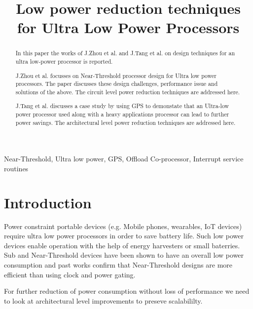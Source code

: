 \documentclass[conference]{IEEEtran}
\begin{document}
\title{Low power reduction techniques for Ultra Low Power Processors}

\author{
}

\maketitle

\begin{abstract}
In this paper the works of J.Zhou et al. \cite{b1} and J.Tang et al. \cite{b2}
on design techniques for an ultra low-power processor is reported.

J.Zhou et al. focusses on Near-Threshold processor design for Ultra low power
processors. The paper discusses these design challenges, performance issue and solutions
of the above. The circuit level power reduction techniques are addressed here.

J.Tang et al. discusses a case study by using GPS to demonstate that an
Ultra-low power processor used along with a heavy applications processor can
lead to further power savings. The architectural level power reduction
techniques are addressed here.
\end{abstract}

\begin{IEEEkeywords}
Near-Threshold, Ultra low power, GPS, Offload Co-processor, Interrupt service
routines
\end{IEEEkeywords}

\section{Introduction} \label{sec:introduction}

Power constraint portable devices (e.g. Mobile phones, wearables, IoT
devices) require ultra low power processors in order to save battery life. Such
low power devices enable operation with the help of energy harvesters or small baterries.
Sub and Near-Threshold devices have been shown to have an overall low power
consumption and past works confirm that Near-Threshold designs are more
efficient than using clock and power gating.

For further reduction of power consumption without loss of performance we need to look at architectural
level improvements to preseve scalabililty.
\end{document}
